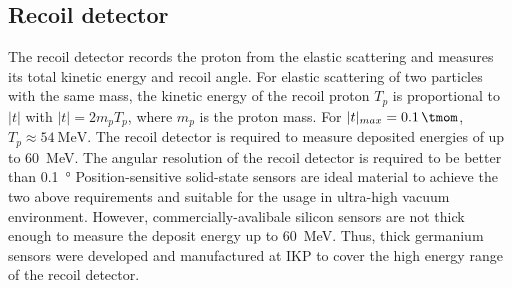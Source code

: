 \documentclass[number,5p]{elsarticle}
\begin{document}
\subsection{Recoil detector}
\label{sec:recoil}

The recoil detector records the proton from the
elastic scattering and measures its total kinetic energy and recoil angle.
For elastic scattering of two particles with the same mass,
the kinetic energy of the recoil proton \(T_p\) is proportional to $|t|$ with \(|t| = 2m_pT_p\), where \(m_p\) is the proton mass.
For $|t|_{max}=\SI{0.1}{\tmom}$, \(T_p \approx \SI{54}{\MeV}\).
The recoil detector is required to measure deposited energies of up to \SI{60}{\MeV}.
The angular resolution of the recoil detector is required to be better than \SI{0.1}{\degree}
Position-sensitive solid-state sensors are ideal material to achieve the two
above requirements and suitable for the usage in ultra-high vacuum environment.
However, commercially-avalibale silicon sensors are not thick enough to measure the deposit energy up to \SI{60}{\MeV}.
Thus, thick germanium sensors were developed and manufactured at IKP to cover the high energy range of the recoil detector.
\end{document}
